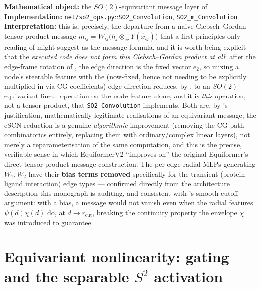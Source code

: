 \documentclass[11pt,a4paper]{report}
\theoremstyle{definition}
\theoremstyle{remark}
\newcommand{\file}[1]{\texttt{#1}}
\newcommand{\pyfunc}[1]{\texttt{#1}}
\begin{document}
\begin{codebox}
\textbf{Mathematical object:} the $SO(2)$-equivariant message layer of
 \\
\textbf{Implementation:} \file{net/so2\_ops.py}::\pyfunc{SO2\_Convolution},
\pyfunc{SO2\_m\_Convolution} \\
\textbf{Interpretation:} this is, precisely, the departure from a naive
Clebsch--Gordan-tensor-product message
$m_{ij}=W_{ij}\bigl(h_j\otimes_{\mathrm{cg}}Y(\hat x_{ij})\bigr)$ that a
first-principles-only reading of  might suggest as the
message formula, and it is worth being explicit that the \emph{executed
code does not form this Clebsch--Gordan product at all}: after the
edge-frame rotation of , the edge direction is
the fixed vector $e_2$, so mixing a node's steerable feature with the
(now-fixed, hence not needing to be explicitly multiplied in via CG
coefficients) edge direction reduces, by
, to an $SO(2)$-equivariant linear operation on
the node feature alone, and it is \emph{this} operation, not a tensor
product, that \pyfunc{SO2\_Convolution} implements. Both are, by
's justification, mathematically legitimate
realisations of an equivariant message; the eSCN reduction is a genuine
\emph{algorithmic} improvement (removing the CG-path combinatorics
entirely, replacing them with ordinary/complex linear layers), not merely
a reparameterisation of the same computation, and this is the precise,
verifiable sense in which EquiformerV2 ``improves on'' the original
Equiformer's direct tensor-product message construction. The per-edge
radial MLPs generating $W_1,W_2$ have their \textbf{bias terms removed}
specifically for the transient (protein--ligand interaction) edge types
--- confirmed directly from the architecture description this monograph
is auditing, and consistent with 's smooth-cutoff
argument: with a bias, a message would not vanish even when the radial
features $\psi(d)\chi(d)$ do, at $d\to r_{\mathrm{cut}}$, breaking the
continuity property the envelope $\chi$ was introduced to guarantee.
\end{codebox}

\section{Equivariant nonlinearity: gating and the separable $S^2$ activation}
\label{sec:equiformer-nonlinearity}
\end{document}
